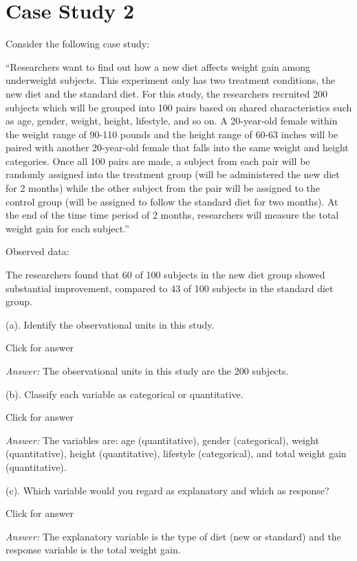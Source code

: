 \documentclass[
]{book}
\begin{document}
\hypertarget{case-study-2}{%
\section{Case Study 2}\label{case-study-2}}

Consider the following case study:

``Researchers want to find out how a new diet affects weight gain among underweight subjects. This experiment only has two treatment conditions, the new diet and the standard diet. For this study, the researchers recruited 200 subjects which will be grouped into 100 pairs based on shared characteristics such as age, gender, weight, height, lifestyle, and so on. A 20-year-old female within the weight range of 90-110 pounds and the height range of 60-63 inches will be paired with another 20-year-old female that falls into the same weight and height categories. Once all 100 pairs are made, a subject from each pair will be randomly assigned into the treatment group (will be administered the new diet for 2 months) while the other subject from the pair will be assigned to the control group (will be assigned to follow the standard diet for two months). At the end of the time time period of 2 months, researchers will measure the total weight gain for each subject.''

Observed data:

The researchers found that 60 of 100 subjects in the new diet group showed substantial improvement, compared to 43 of 100 subjects in the standard diet group.

(a). Identify the observational units in this study.

Click for answer

\emph{Answer:} The observational units in this study are the 200 subjects.

(b). Classify each variable as categorical or quantitative.

Click for answer

\emph{Answer:} The variables are: age (quantitative), gender (categorical), weight (quantitative), height (quantitative), lifestyle (categorical), and total weight gain (quantitative).

(c). Which variable would you regard as explanatory and which as response?

Click for answer

\emph{Answer:} The explanatory variable is the type of diet (new or standard) and the response variable is the total weight gain.
\end{document}
